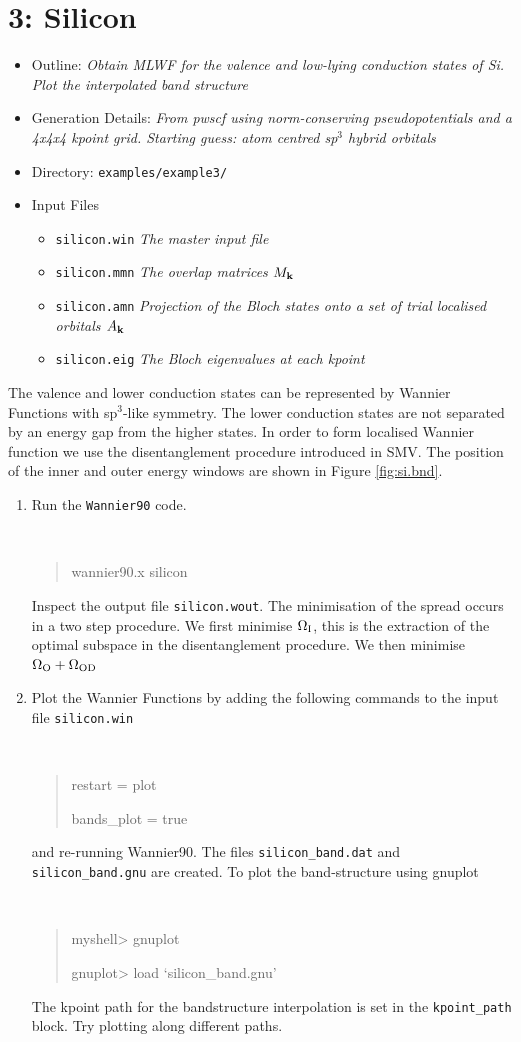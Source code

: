 \documentclass[a4paper,11pt,twoside]{article}
\begin{document}
\cleardoublepage


\section*{3: Silicon}

\begin{itemize}
\item{Outline: \it{Obtain MLWF for the valence and low-lying conduction states of Si. Plot the interpolated band structure}}
\item{Generation Details: \it{From pwscf using norm-conserving pseudopotentials
and a 4x4x4 kpoint grid. Starting guess:  atom centred sp$^3$ hybrid orbitals}}
\item{Directory: {\tt examples/example3/}}
\item{Input Files}
\begin{itemize}
\item{ {\tt silicon.win}  {\it The master input file}}
\item{ {\tt silicon.mmn}  {\it The overlap matrices $M_{{\bf k}}$}}
\item{ {\tt silicon.amn}  {\it Projection of the Bloch states onto a set of trial localised orbitals $A_{{\bf k}}$}}
\item{ {\tt silicon.eig}  {\it The Bloch eigenvalues at each kpoint}}
\end{itemize}
\end{itemize}
The valence and lower conduction states can be represented by Wannier
Functions with sp$^3$-like symmetry. The lower conduction states are not
separated by an energy gap from the higher states. In order to form
localised Wannier function we use the disentanglement procedure
introduced in SMV. The position of the inner and outer energy windows
are shown in Figure \ref{fig:si.bnd}. 
\begin{enumerate}
\item Run the {\tt Wannier90} code.
{\tt
\begin{quote}
wannier90.x silicon
\end{quote} }
Inspect the output file {\tt silicon.wout}. The minimisation of the
spread occurs in a two step procedure. We first minimise $\Omega_{\rm
  I}$, this is the extraction of the optimal subspace in the
disentanglement procedure. We then minimise $\Omega_{\rm O}+\Omega_{{\rm
    OD}}$ 


\item Plot the Wannier Functions by adding the following commands to the input file {\tt silicon.win}
{\tt
\begin{quote}
restart = plot

bands\_plot = true
\end{quote} }
and re-running Wannier90. The files {\tt silicon\_band.dat} and {\tt silicon\_band.gnu} are created.
To plot the band-structure using gnuplot
\smallskip
{\tt
\begin{quote}
myshell> gnuplot

gnuplot> load `silicon\_band.gnu'
\end{quote} }
The kpoint path for the bandstructure interpolation is set in the {\tt kpoint\_path} block. Try plotting along different paths.
\end{enumerate}
\end{document}
